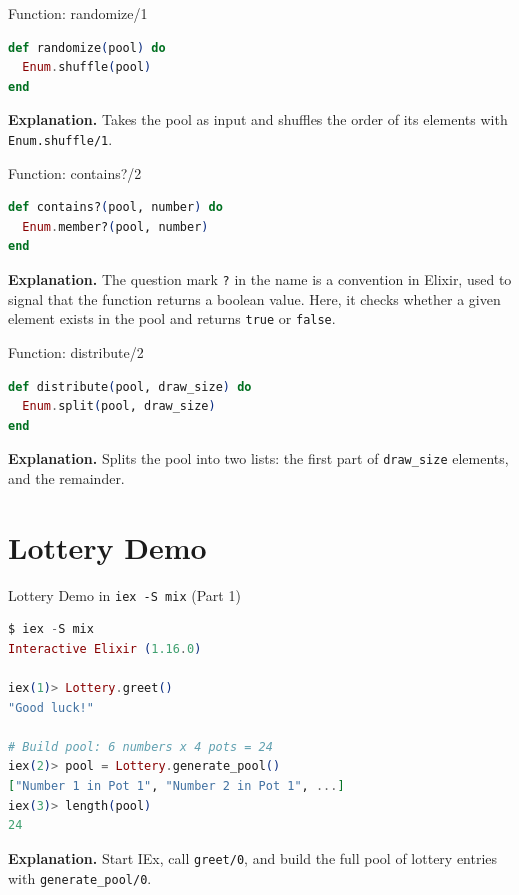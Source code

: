 \documentclass[aspectratio=169, table]{beamer}
\begin{document}
\begin{frame}[fragile]{Function: randomize/1}
\vspace{20pt}
\begin{lstlisting}[language=Elixir]
def randomize(pool) do
  Enum.shuffle(pool)
end
\end{lstlisting}

\textbf{Explanation.}  
Takes the pool as input and shuffles the order of  
its elements with \texttt{Enum.shuffle/1}.  
\end{frame}

\begin{frame}[fragile]{Function: contains?/2}
\vspace{20pt}
\begin{lstlisting}[language=Elixir]
def contains?(pool, number) do
  Enum.member?(pool, number)
end
\end{lstlisting}

\textbf{Explanation.}  
The question mark \texttt{?} in the name is a convention in Elixir,  
used to signal that the function returns a boolean value.  
Here, it checks whether a given element exists in the pool  
and returns \texttt{true} or \texttt{false}.  
\end{frame}


\begin{frame}[fragile]{Function: distribute/2}
\vspace{20pt}
\begin{lstlisting}[language=Elixir]
def distribute(pool, draw_size) do
  Enum.split(pool, draw_size)
end
\end{lstlisting}

\textbf{Explanation.}  
Splits the pool into two lists:  
the first part of \texttt{draw\_size} elements,  
and the remainder.  
\end{frame}

\section{Lottery Demo}

\begin{frame}[fragile]{Lottery Demo in \texttt{iex -S mix} (Part 1)}
\vspace{20pt}
\begin{lstlisting}[language=Elixir]
$ iex -S mix
Interactive Elixir (1.16.0)

iex(1)> Lottery.greet()
"Good luck!"

# Build pool: 6 numbers x 4 pots = 24
iex(2)> pool = Lottery.generate_pool()
["Number 1 in Pot 1", "Number 2 in Pot 1", ...]
iex(3)> length(pool)
24
\end{lstlisting}

\textbf{Explanation.}  
Start IEx, call \texttt{greet/0}, and build the full pool  
of lottery entries with \texttt{generate\_pool/0}.  
\end{frame}
\end{document}
